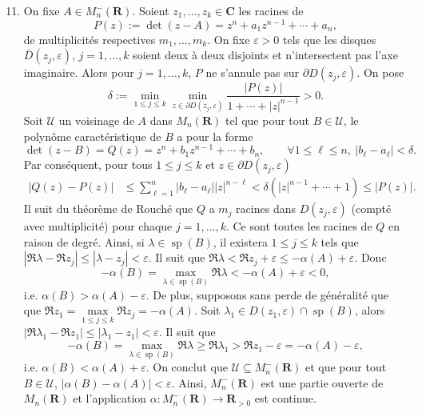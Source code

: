 \documentclass[french, 12pt]{article}
\theoremstyle{definition}
\newcommand{\ol}[1]{\overline{#1}}
\newcommand{\Cbb}{\mathbf{C}}
\newcommand{\Rbb}{\mathbf{R}}
\newcommand{\Ucal}{\mathcal{U}}
\newcommand{\spec}{\operatorname{sp}}
\begin{document}
\begin{enumerate}
    \setcounter{enumi}{10}
    \item \label{Partie11} On fixe $A \in M_n^{-}(\Rbb)$. Soient $z_1,\ldots,z_k \in \Cbb$ les racines de 
        $$P(z) := \det(z - A) = z^n + a_1z^{n-1} + \cdots + a_n,$$
    de multiplicit\'es respectives $m_1,\ldots,m_k$. On fixe $\varepsilon > 0$ tels que les disques $\ol{D}(z_j,\varepsilon)$, $j = 1,\ldots,k$ soient deux \`a deux disjoints et n'intersectent pas l'axe imaginaire. Alors pour $j = 1,\ldots,k$, $P$ ne s'annule pas sur $\partial D(z_j,\varepsilon)$. On pose
        $$\delta:=\min_{1 \le j \le k}\min_{z \in \partial D(z_j,\varepsilon)}\frac{|P(z)|}{1 + \cdots + |z|^{n-1}} > 0.$$
    Soit $\Ucal$ un voisinage de $A$ dans $M_n(\Rbb)$ tel que pour tout $B \in \Ucal$, le polyn\^ome caract\'eristique de $B$ a pour la forme
        $$\det(z - B) = Q(z) = z^n + b_1z^{n-1} + \cdots + b_n, \qquad \forall 1 \le \ell \le n,\ |b_\ell - a_\ell| < \delta.$$
    Par cons\'equent, pour tous $1 \le j \le k$ et $z \in \partial D(z_j,\varepsilon)$
        \begin{align*}
            |Q(z) - P(z)| & \le \sum_{\ell = 1}^n |b_\ell - a_\ell||z|^{n - \ell}
            < \delta(|z|^{n-1} + \cdots + 1)
             \le |P(z)|.
        \end{align*}
    Il suit du th\'eor\`eme de Rouch\'e que $Q$ a $m_j$ racines dans $D(z_j,\varepsilon)$ (compt\'e avec multiplicit\'e) pour chaque $j = 1,\ldots,k$. Ce sont toutes les racines de $Q$ en raison de degr\'e. Ainsi, si $\lambda \in \spec(B)$, il existera $1 \le j \le k$ tels que $|\Re\lambda - \Re z_j| \le |\lambda - z_j| < \varepsilon$. Il suit que $\Re \lambda < \Re z_j + \varepsilon \le -\alpha(A) + \varepsilon$. Donc
        $$-\alpha(B) = \max_{\lambda \in \spec(B)} \Re \lambda < -\alpha(A) + \varepsilon < 0,$$
    i.e. $\alpha(B) > \alpha(A) - \varepsilon$. De plus, supposons sans perde de g\'en\'eralit\'e que que $\Re z_1 = \max\limits_{1 \le j \le k}\Re z_j = -\alpha(A)$. Soit $\lambda_1 \in D(z_1,\varepsilon) \cap \spec(B)$, alors $|\Re \lambda_1 - \Re z_1| \le |\lambda_1 - z_1| < \varepsilon$. Il suit que
        $$-\alpha(B) = \max_{\lambda \in \spec(B)}\Re \lambda \ge \Re \lambda_1 > \Re z_1 - \varepsilon = -\alpha(A) - \varepsilon,$$
    i.e. $\alpha(B) < \alpha(A) + \varepsilon$. On conclut que $\Ucal \subseteq M_n^{-}(\Rbb)$ et que pour tout $B \in \Ucal$, $|\alpha(B) - \alpha(A)| < \varepsilon$. Ainsi, $M_n^{-}(\Rbb)$ est une partie ouverte de $M_n(\Rbb)$ et l'application $\alpha: M_n^{-}(\Rbb) \to \Rbb_{> 0}$ est continue.
    

\end{enumerate}
\end{document}
